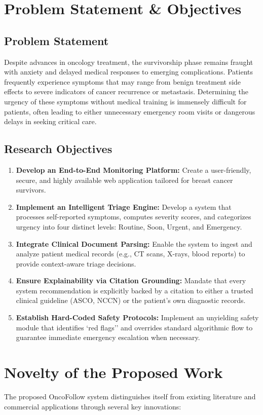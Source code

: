 \documentclass[10pt,journal,compsoc]{IEEEtran}
\begin{document}
\section{Problem Statement \& Objectives}
\subsection{Problem Statement}
Despite advances in oncology treatment, the survivorship phase remains fraught with anxiety and delayed medical responses to emerging complications. Patients frequently experience symptoms that may range from benign treatment side effects to severe indicators of cancer recurrence or metastasis. Determining the urgency of these symptoms without medical training is immensely difficult for patients, often leading to either unnecessary emergency room visits or dangerous delays in seeking critical care.

\subsection{Research Objectives}
\begin{enumerate}
    \item \textbf{Develop an End-to-End Monitoring Platform:} Create a user-friendly, secure, and highly available web application tailored for breast cancer survivors.
    \item \textbf{Implement an Intelligent Triage Engine:} Develop a system that processes self-reported symptoms, computes severity scores, and categorizes urgency into four distinct levels: Routine, Soon, Urgent, and Emergency.
    \item \textbf{Integrate Clinical Document Parsing:} Enable the system to ingest and analyze patient medical records (e.g., CT scans, X-rays, blood reports) to provide context-aware triage decisions.
    \item \textbf{Ensure Explainability via Citation Grounding:} Mandate that every system recommendation is explicitly backed by a citation to either a trusted clinical guideline (ASCO, NCCN) or the patient's own diagnostic records.
    \item \textbf{Establish Hard-Coded Safety Protocols:} Implement an unyielding safety module that identifies `red flags'' and overrides standard algorithmic flow to guarantee immediate emergency escalation when necessary.
\end{enumerate}

\section{Novelty of the Proposed Work}
The proposed OncoFollow system distinguishes itself from existing literature and commercial applications through several key innovations:
\end{document}
